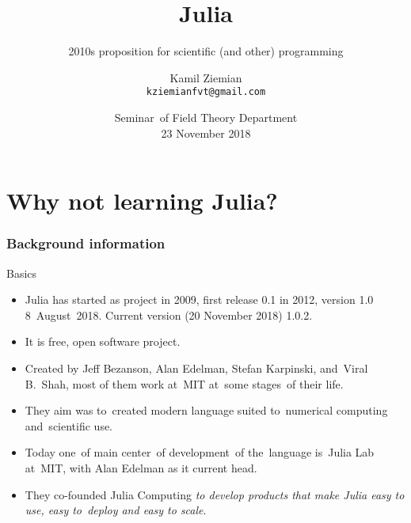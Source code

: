 \documentclass{beamer}  %
\title[]{Julia}
\subtitle{2010s proposition for scientific (and other) programming}
\author{Kamil Ziemian \\
  \texttt{kziemianfvt@gmail.com} }
\date[23 November 2018]{Seminar~of Field Theory Department \\
  23 November 2018}
\begin{document}



\begin{frame}
  \titlepage  %
\end{frame}






\section[]{Why not learning Julia?}





\begin{frame}
  \frametitle{Background information}

  \begin{block}{Basics}
    \begin{itemize}
    \item Julia has started as project in 2009, first release 0.1 in
      2012, version 1.0 8~August~2018. Current version (20 November
      2018) 1.0.2.
    \item It is free, open software project.
    \item Created by Jeff Bezanson, Alan Edelman, Stefan Karpinski,
      and~Viral B.~Shah, most of them work at~MIT at~some stages~of
      their life.
    \item They aim was to~created modern language suited to~numerical
      computing and~scientific use.
    \item Today one~of main center~of development~of the~language
      is~Julia Lab at~MIT, with Alan Edelman as it current head.
    \item They co-founded Julia Computing \emph{to develop products
        that make Julia easy to use, easy to~deploy and easy to
        scale}.
    \end{itemize}
  \end{block}

\end{frame}
\end{document}
